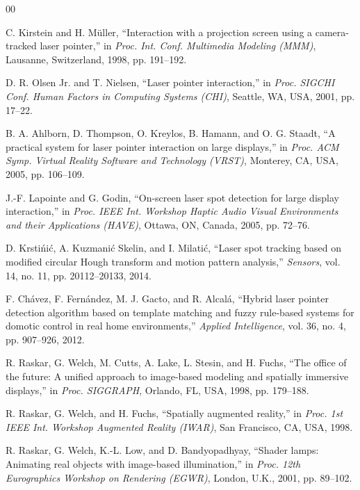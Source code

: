 \documentclass[conference]{IEEEtran}
\begin{document}
\begin{thebibliography}{00}

 C. Kirstein and H. M\"uller, ``Interaction with a projection screen using a camera-tracked laser pointer,'' in \emph{Proc. Int. Conf. Multimedia Modeling (MMM)}, Lausanne, Switzerland, 1998, pp. 191--192.

 D. R. Olsen Jr. and T. Nielsen, ``Laser pointer interaction,'' in \emph{Proc. SIGCHI Conf. Human Factors in Computing Systems (CHI)}, Seattle, WA, USA, 2001, pp. 17--22.

 B. A. Ahlborn, D. Thompson, O. Kreylos, B. Hamann, and O. G. Staadt, ``A practical system for laser pointer interaction on large displays,'' in \emph{Proc. ACM Symp. Virtual Reality Software and Technology (VRST)}, Monterey, CA, USA, 2005, pp. 106--109.

 J.-F. Lapointe and G. Godin, ``On-screen laser spot detection for large display interaction,'' in \emph{Proc. IEEE Int. Workshop Haptic Audio Visual Environments and their Applications (HAVE)}, Ottawa, ON, Canada, 2005, pp. 72--76.

 D. Krsti\'ni\'c, A. Kuzmani\'c Skelin, and I. Milati\'c, ``Laser spot tracking based on modified circular Hough transform and motion pattern analysis,'' \emph{Sensors}, vol. 14, no. 11, pp. 20112--20133, 2014.

 F. Ch\'avez, F. Fern\'andez, M. J. Gacto, and R. Alcal\'a, ``Hybrid laser pointer detection algorithm based on template matching and fuzzy rule-based systems for domotic control in real home environments,'' \emph{Applied Intelligence}, vol. 36, no. 4, pp. 907--926, 2012.

 R. Raskar, G. Welch, M. Cutts, A. Lake, L. Stesin, and H. Fuchs, ``The office of the future: A unified approach to image-based modeling and spatially immersive displays,'' in \emph{Proc. SIGGRAPH}, Orlando, FL, USA, 1998, pp. 179--188.

 R. Raskar, G. Welch, and H. Fuchs, ``Spatially augmented reality,'' in \emph{Proc. 1st IEEE Int. Workshop Augmented Reality (IWAR)}, San Francisco, CA, USA, 1998.

 R. Raskar, G. Welch, K.-L. Low, and D. Bandyopadhyay, ``Shader lamps: Animating real objects with image-based illumination,'' in \emph{Proc. 12th Eurographics Workshop on Rendering (EGWR)}, London, U.K., 2001, pp. 89--102.


\end{thebibliography}
\end{document}
